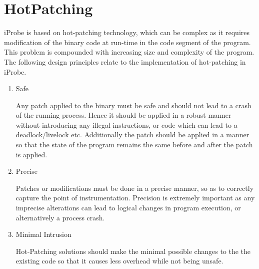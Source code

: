 \section{HotPatching}
\label{sec:hotpatch}


iProbe is based on hot-patching technology, which can be complex as it requires modification of the binary code at run-time in the code segment of the program.
This problem is compounded with increasing size and complexity of the program.
The following design principles relate to the implementation of hot-patching in iProbe.

\begin{enumerate}
  
  \item Safe
  
   Any patch applied to the binary must be safe and should not lead to a crash of the running process.
  Hence it should be applied in a robust manner without introducing any illegal instructions, or code which can lead to a deadlock/livelock etc.
  Additionally the patch should be applied in a manner so that the state of the program remains the same before and after the patch is applied.
  
  \item Precise
  
  Patches or modifications must be done in a precise manner, so as to correctly capture the point of instrumentation. 
  Precision is extremely important as any imprecise alterations can lead to logical changes in program execution, or alternatively a process crash.
  
  \item Minimal Intrusion
  
  Hot-Patching solutions should make the minimal possible changes to the the existing code so that it causes less overhead while not being unsafe.

\end{enumerate}


